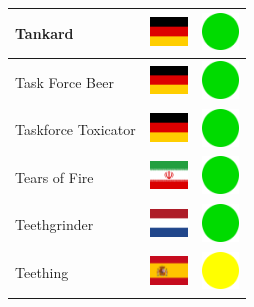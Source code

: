 \documentclass[12pt, a4paper, twoside]{report}
\begin{document}
\begin{center}
\begin{longtable}{|p{5cm}|p{2cm}|p{2cm}|}
 Tankard                                                    & \includegraphics[width=1cm]{../img/flags/de} &   \includegraphics[width=1cm]{../likes/y} \\ \hline
 Task Force Beer                                            & \includegraphics[width=1cm]{../img/flags/de} &   \includegraphics[width=1cm]{../likes/y} \\ \hline
 Taskforce Toxicator                                        & \includegraphics[width=1cm]{../img/flags/de} &   \includegraphics[width=1cm]{../likes/y} \\ \hline
 Tears of Fire                                              & \includegraphics[width=1cm]{../img/flags/ir} &   \includegraphics[width=1cm]{../likes/y} \\ \hline
 Teethgrinder                                               & \includegraphics[width=1cm]{../img/flags/nl} &   \includegraphics[width=1cm]{../likes/y} \\ \hline
 Teething                                                   & \includegraphics[width=1cm]{../img/flags/es} &   \includegraphics[width=1cm]{../likes/m} \\ \hline

\end{longtable}
\end{center}
\end{document}
